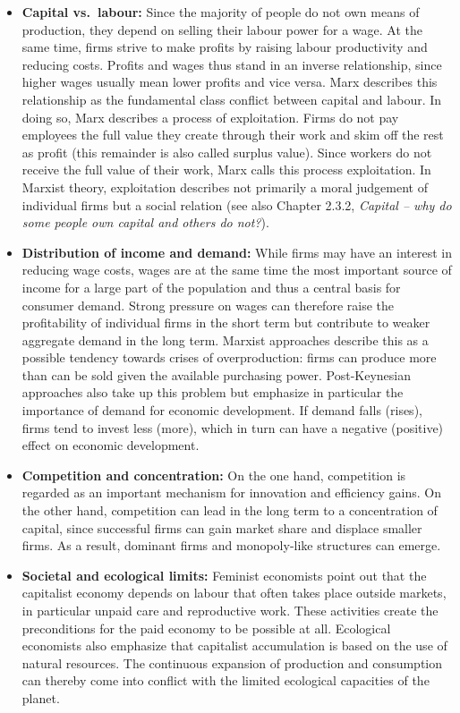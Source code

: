 \documentclass[
  british,
  a4paper,
  DIV=11,
  numbers=noendperiod,
  oneside,
  openany]{scrreprt}
\begin{document}
\begin{itemize}
\item
  \textbf{Capital vs.~labour:} Since the majority of people do not own
  means of production, they depend on selling their labour power for a
  wage. At the same time, firms strive to make profits by raising labour
  productivity and reducing costs. Profits and wages thus stand in an
  inverse relationship, since higher wages usually mean lower profits
  and vice versa. Marx describes this relationship as the fundamental
  class conflict between capital and labour. In doing so, Marx describes
  a process of exploitation. Firms do not pay employees the full value
  they create through their work and skim off the rest as profit (this
  remainder is also called surplus value). Since workers do not receive
  the full value of their work, Marx calls this process exploitation. In
  Marxist theory, exploitation describes not primarily a moral judgement
  of individual firms but a social relation (see also Chapter 2.3.2,
  \emph{Capital -- why do some people own capital and others do not?}).
\item
  \textbf{Distribution of income and demand:} While firms may have an
  interest in reducing wage costs, wages are at the same time the most
  important source of income for a large part of the population and thus
  a central basis for consumer demand. Strong pressure on wages can
  therefore raise the profitability of individual firms in the short
  term but contribute to weaker aggregate demand in the long term.
  Marxist approaches describe this as a possible tendency towards crises
  of overproduction: firms can produce more than can be sold given the
  available purchasing power. Post-Keynesian approaches also take up
  this problem but emphasize in particular the importance of demand for
  economic development. If demand falls (rises), firms tend to invest
  less (more), which in turn can have a negative (positive) effect on
  economic development.
\item
  \textbf{Competition and concentration:} On the one hand, competition
  is regarded as an important mechanism for innovation and efficiency
  gains. On the other hand, competition can lead in the long term to a
  concentration of capital, since successful firms can gain market share
  and displace smaller firms. As a result, dominant firms and
  monopoly-like structures can emerge.
\item
  \textbf{Societal and ecological limits:} Feminist economists point out
  that the capitalist economy depends on labour that often takes place
  outside markets, in particular unpaid care and reproductive work.
  These activities create the preconditions for the paid economy to be
  possible at all. Ecological economists also emphasize that capitalist
  accumulation is based on the use of natural resources. The continuous
  expansion of production and consumption can thereby come into conflict
  with the limited ecological capacities of the planet.
\end{itemize}
\end{document}
